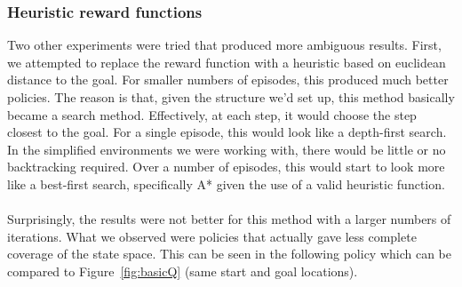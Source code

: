 \documentclass{aiaa-tc}%
\begin{document}
\subsubsection{Heuristic reward functions}
Two other experiments were tried that produced more ambiguous
results. First, we attempted to replace the reward function with a
heuristic based on euclidean distance to the goal. For smaller numbers
of episodes, this produced much better policies. The reason is that,
given the structure we'd set up, this method basically became a
search method. Effectively, at each step, it
would choose the step closest to the goal. For a single episode,
this would look like a depth-first search. In the simplified
environments we were working with, there would be little or no
backtracking required. Over a number of episodes, this would start to
look more like a best-first search, specifically A* given the use of a
valid heuristic function. \\ \\
Surprisingly, the results were not better for this method with a larger
numbers of iterations. What we observed were policies that actually
gave less complete coverage of the state space. This can be seen in
the following policy which can be compared to Figure~\ref{fig:basicQ} (same
start and goal locations).

\vspace{.3in}
\end{document}
